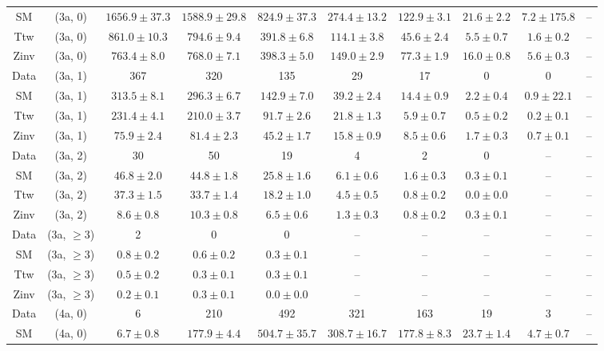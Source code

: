 \begin{table}[h!]
{\begin{tabular}{cccccccccc}
	SM & (3a, 0) & $1656.9\pm 37.3$ & $1588.9\pm 29.8$ & $824.9\pm 37.3$ & $274.4\pm 13.2$ & $122.9\pm 3.1$ & $21.6\pm 2.2$ & $7.2\pm 175.8$ & -- \\[0.5ex] 
	Ttw & (3a, 0) & $861.0\pm 10.3$ & $794.6\pm 9.4$ & $391.8\pm 6.8$ & $114.1\pm 3.8$ & $45.6\pm 2.4$ & $5.5\pm 0.7$ & $1.6\pm 0.2$ & -- \\[0.5ex] 
	Zinv & (3a, 0) & $763.4\pm 8.0$ & $768.0\pm 7.1$ & $398.3\pm 5.0$ & $149.0\pm 2.9$ & $77.3\pm 1.9$ & $16.0\pm 0.8$ & $5.6\pm 0.3$ & -- \\[0.5ex] 
	Data & (3a, 1) & 367 & 320 & 135 & 29 & 17 & 0 & 0 & -- \\[0.5ex] 
	SM & (3a, 1) & $313.5\pm 8.1$ & $296.3\pm 6.7$ & $142.9\pm 7.0$ & $39.2\pm 2.4$ & $14.4\pm 0.9$ & $2.2\pm 0.4$ & $0.9\pm 22.1$ & -- \\[0.5ex] 
	Ttw & (3a, 1) & $231.4\pm 4.1$ & $210.0\pm 3.7$ & $91.7\pm 2.6$ & $21.8\pm 1.3$ & $5.9\pm 0.7$ & $0.5\pm 0.2$ & $0.2\pm 0.1$ & -- \\[0.5ex] 
	Zinv & (3a, 1) & $75.9\pm 2.4$ & $81.4\pm 2.3$ & $45.2\pm 1.7$ & $15.8\pm 0.9$ & $8.5\pm 0.6$ & $1.7\pm 0.3$ & $0.7\pm 0.1$ & -- \\[0.5ex] 
	Data & (3a, 2) & 30 & 50 & 19 & 4 & 2 & 0 & -- & -- \\[0.5ex] 
	SM & (3a, 2) & $46.8\pm 2.0$ & $44.8\pm 1.8$ & $25.8\pm 1.6$ & $6.1\pm 0.6$ & $1.6\pm 0.3$ & $0.3\pm 0.1$ & -- & -- \\[0.5ex] 
	Ttw & (3a, 2) & $37.3\pm 1.5$ & $33.7\pm 1.4$ & $18.2\pm 1.0$ & $4.5\pm 0.5$ & $0.8\pm 0.2$ & $0.0\pm 0.0$ & -- & -- \\[0.5ex] 
	Zinv & (3a, 2) & $8.6\pm 0.8$ & $10.3\pm 0.8$ & $6.5\pm 0.6$ & $1.3\pm 0.3$ & $0.8\pm 0.2$ & $0.3\pm 0.1$ & -- & -- \\[0.5ex] 
	Data & (3a, $\ge3$) & 2 & 0 & 0 & -- & -- & -- & -- & -- \\[0.5ex] 
	SM & (3a, $\ge3$) & $0.8\pm 0.2$ & $0.6\pm 0.2$ & $0.3\pm 0.1$ & -- & -- & -- & -- & -- \\[0.5ex] 
	Ttw & (3a, $\ge3$) & $0.5\pm 0.2$ & $0.3\pm 0.1$ & $0.3\pm 0.1$ & -- & -- & -- & -- & -- \\[0.5ex] 
	Zinv & (3a, $\ge3$) & $0.2\pm 0.1$ & $0.3\pm 0.1$ & $0.0\pm 0.0$ & -- & -- & -- & -- & -- \\[0.5ex] 
	Data & (4a, 0) & 6 & 210 & 492 & 321 & 163 & 19 & 3 & -- \\[0.5ex] 
	SM & (4a, 0) & $6.7\pm 0.8$ & $177.9\pm 4.4$ & $504.7\pm 35.7$ & $308.7\pm 16.7$ & $177.8\pm 8.3$ & $23.7\pm 1.4$ & $4.7\pm 0.7$ & -- \\[0.5ex] 

\end{tabular}}
\end{table}
